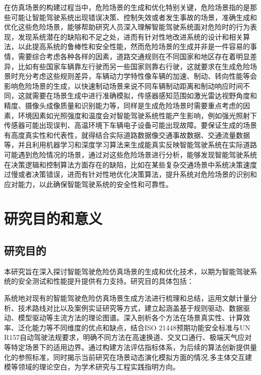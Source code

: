 在仿真场景的构建过程当中，危险场景的生成和优化特别关键，危险场景指的是那些可能让智能驾驶系统出现错误决策、控制失效或者发生事故的场景，准确生成和优化这些危险场景，能够帮助研究人员深入理解智能驾驶系统面对危险时的行为表现，发现系统潜在的缺陷和不足之处，进而有针对性地改进系统的设计和相关算法，以此提高系统的鲁棒性和安全性能，然而危险场景的生成并非是一件容易的事情，需要综合考虑各种各样的因素，道路交通规则在不同国家和地区存在着明显差异，比如有些国家车辆靠左行驶而另一些国家则靠右行驶，这就要求在生成危险场景时充分考虑这些规则差异，车辆动力学特性像车辆的加速、制动、转向性能等会影响危险场景的生成，以快速制动场景来说不同车辆制动距离和制动响应时间不同，这就需要在场景生成中进行准确模拟，传感器感知范围如激光雷达视野角度和精度、摄像头成像质量和识别能力等，同样是生成危险场景时需要重点考虑的因素，环境因素如光照强度和温度会对智能驾驶系统性能产生影响，例如强光照射下传感器可能出现误判、高温环境下车辆电子设备可能出现故障。要保证生成的场景有高度真实性和代表性，就得结合实际道路数据像交通事故数据、交通流量数据等\cite{deichmann2023autonomous}，并且利用机器学习和深度学习算法来生成能真实反映智能驾驶系统在实际道路可能遇到危险情况的场景，通过对这些危险场景进行分析，能够发现智能驾驶系统在决策逻辑和控制算法方面存在的缺陷，比如在某些复杂交通场景中系统决策速度过慢或者决策错误，进而有针对性地优化决策算法，提升系统对危险场景的识别和应对能力，以此确保智能驾驶系统的安全性和可靠性。



\section{研究目的和意义}

\subsection{研究目的}
本研究旨在深入探讨智能驾驶危险仿真场景的生成和优化技术，以期为智能驾驶系统的安全测试和性能提升提供有力支持。研究目的具体包括：

系统地对现有的智能驾驶危险仿真场景生成方法进行梳理和总结，运用文献计量分析、技术路线对比以及案例实证研究等方式，建立起涵盖基于规则驱动、数据驱动、模型驱动等主流方法的理论图谱。深入剖析各个方法在场景真实性、计算效率、泛化能力等不同维度的优点和缺点，结合ISO 21448预期功能安全标准与UN R157自动驾驶法规要求，明确不同方法在高速换道、交叉口通行、极端天气应对等特定场景下的适用边界。通过构建方法评估指标体系，为后续的算法创新提供量化的参照标准\cite{zhang2024chatscene}，同时揭示当前研究在场景动态演化模拟方面的情况,多主体交互建模等领域的理论空白，为学术研究与工程实践指明方向。​

